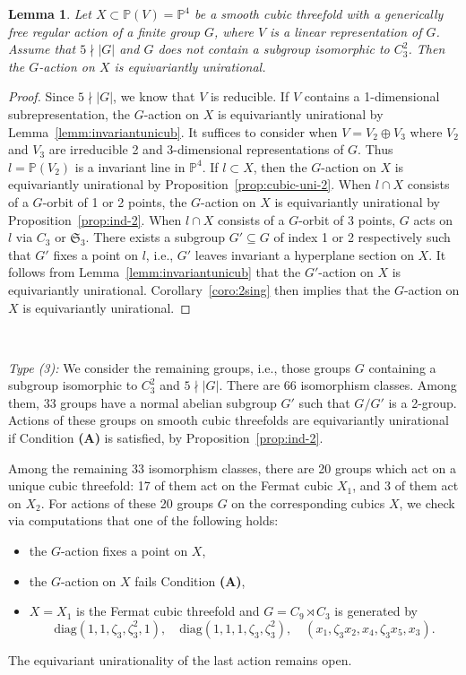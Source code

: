 \documentclass[12pt,reqno]{amsart}
\theoremstyle{plain}
\newtheorem{lemm}[prop]{Lemma}
\theoremstyle{remark}
\theoremstyle{definition}
\numberwithin{equation}{section}
\def\fS{{\mathfrak S}}
\def\fS{{\mathfrak S}}
\def\bP{{\mathbb P}}
\begin{document}
\begin{lemm}
    Let $X\subset \bP(V)=\bP^4$ be a smooth cubic threefold with a generically free regular action of a finite group $G$, where $V$ is a linear representation of $G$. Assume that $5\nmid |G|$ and $G$ does not contain a subgroup isomorphic to $C_3^2$. Then the $G$-action on $X$ is equivariantly unirational.
\end{lemm}
\begin{proof}
    Since $5\nmid |G|$, we know that $V$ is reducible. If $V$ contains a 1-dimensional subrepresentation, the $G$-action on $X$ is equivariantly unirational by Lemma~\ref{lemm:invariantunicub}. It suffices to consider when $V=V_2\oplus V_3$ where $V_2$ and $V_3$ are irreducible 2 and 3-dimensional representations of $G$.  Thus $l=\bP(V_2)$ is a invariant line in $\bP^4$. If $l\subset X$, then the $G$-action on $X$ is equivariantly unirational by Proposition~\ref{prop:cubic-uni-2}. When $l\cap X$ consists of a $G$-orbit of 1 or 2 points, the $G$-action on $X$ is equivariantly unirational by Proposition~\ref{prop:ind-2}. When $l\cap X$ consists of a $G$-orbit of 3 points, $G$ acts on $l$ via $C_3$ or $\fS_3$. There exists a subgroup $G'\subseteq G$ of index 1 or 2 respectively such that $G'$ fixes a point on $l$, i.e., $G'$ leaves invariant a hyperplane section on $X$. It follows from Lemma~\ref{lemm:invariantunicub} that the $G'$-action on $X$ is equivariantly unirational. Corollary~\ref{coro:2sing} then implies that the $G$-action on $X$ is equivariantly unirational. 
\end{proof}

\

{\em{Type (3):}}  We consider the remaining groups, i.e., those groups $G$ containing a subgroup isomorphic to $C_3^2$ and $5\nmid |G|$. There are 66 isomorphism classes. Among them, 33 groups have a normal abelian subgroup $G'$ such that $G/G'$ is a 2-group. Actions of these groups on smooth cubic threefolds are equivariantly unirational if Condition {\bf (A)} is satisfied,  by Proposition~\ref{prop:ind-2}.



Among the remaining 33 isomorphism classes, there are 20 groups which act on a unique cubic threefold: 17 of them act on the Fermat cubic $X_1$, and 3 of them act on $X_2$. For actions of these 20 groups $G$ on the corresponding cubics $X$, we check via computations that one of the following holds: 
\begin{itemize}
    \item the $G$-action fixes a point on $X$,
    \item the $G$-action on $X$ fails Condition {\bf (A)},
    \item $X=X_1$ is the Fermat cubic threefold and $G=C_9\rtimes C_3$ is generated by 
    $$
    \mathrm{diag}(1,1,\zeta_3,\zeta_3^2,1),  \quad  \mathrm{diag}(1,1,1,\zeta_3,\zeta_3^2), \quad(x_1,\zeta_3x_2,x_4,\zeta_3x_5,x_3).
    $$
\end{itemize}
The equivariant unirationality of the last action remains open. 
\end{document}
